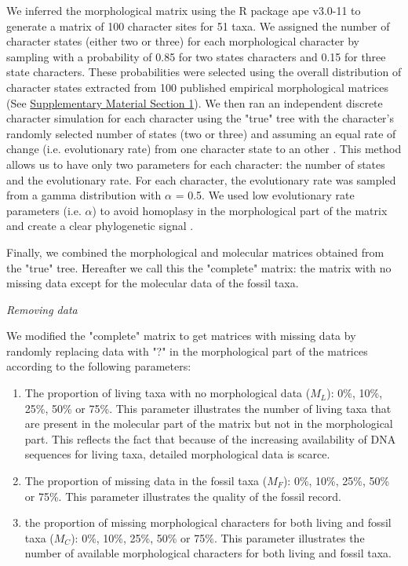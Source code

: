 \documentclass[12pt,letterpaper]{article}
\renewcommand{\subsection}[1]{%
\bigskip
\begin{center}
\begin{large}
\normalfont\itshape #1
\end{large}
\end{center}}
\begin{document}
We inferred the morphological matrix using the R package ape v3.0-11 \citep{paradisape:2004} to generate a matrix of 100 character sites for 51 taxa. We assigned the number of character states (either two or three) for each morphological character by sampling with a probability of 0.85 for two states characters and 0.15 for three state characters. These probabilities were selected using the overall distribution of character states extracted from 100 published empirical morphological matrices (See \hyperref[SupplementaryMaterial]{Supplementary Material Section 1}). We then ran an independent discrete character simulation for each character using the "true" tree with the character's randomly selected number of states (two or three) and assuming an equal rate of change (i.e. evolutionary rate) from one character state to an other \citep{Pagel22011994}. This method allows us to have only two parameters for each character: the number of states and the evolutionary rate. For each character, the evolutionary rate was sampled from a gamma distribution with $\alpha$ = 0.5. We used low evolutionary rate parameters (i.e. $\alpha$) to avoid homoplasy in the morphological part of the matrix and create a clear phylogenetic signal \citep{wagner2000,davalosintegrating2014}.

Finally, we combined the morphological and molecular matrices obtained from the "true" tree. Hereafter we call this the "complete" matrix: the matrix with no missing data except for the molecular data of the fossil taxa.


\subsection{Removing data}
\label{Removing_data}
We modified the "complete" matrix to get matrices with missing data by randomly replacing data with "?" in the morphological part of the matrices according to the following parameters:%

\begin{enumerate}
\item{The proportion of living taxa with no morphological data ($M_{L}$): 0\%, 10\%, 25\%, 50\% or 75\%.}
This parameter illustrates the number of living taxa that are present in the molecular part of the matrix but not in the morphological part. This reflects the fact that because of the increasing availability of DNA sequences for living taxa, detailed morphological data is scarce.
\item{The proportion of missing data in the fossil taxa ($M_{F}$): 0\%, 10\%, 25\%, 50\% or 75\%.}
This parameter illustrates the quality of the fossil record. 
\item{the proportion of missing morphological characters for both living and fossil taxa ($M_{C}$): 0\%, 10\%, 25\%, 50\% or 75\%. }
This parameter illustrates the number of available morphological characters for both living and fossil taxa.
\end{enumerate}
\end{document}
